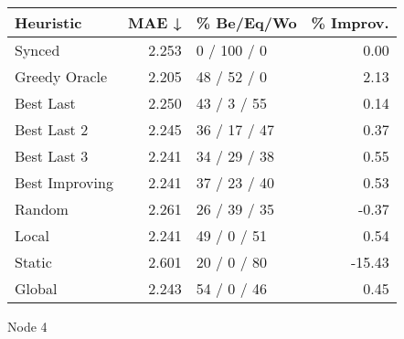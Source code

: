 \begin{tabular}{lrlr}
\toprule
\textbf{Heuristic} & \textbf{MAE ↓} & \textbf{\% Be/Eq/Wo} & \textbf{\% Improv.} \\
\midrule
            Synced &          2.253 &          0 / 100 / 0 &                0.00 \\
     Greedy Oracle &          2.205 &          48 / 52 / 0 &                2.13 \\
         Best Last &          2.250 &          43 / 3 / 55 &                0.14 \\
       Best Last 2 &          2.245 &         36 / 17 / 47 &                0.37 \\
       Best Last 3 &          2.241 &         34 / 29 / 38 &                0.55 \\
    Best Improving &          2.241 &         37 / 23 / 40 &                0.53 \\
            Random &          2.261 &         26 / 39 / 35 &               -0.37 \\
             Local &          2.241 &          49 / 0 / 51 &                0.54 \\
            Static &          2.601 &          20 / 0 / 80 &              -15.43 \\
            Global &          2.243 &          54 / 0 / 46 &                0.45 \\
\bottomrule
\end{tabular}
\caption{Node 4}
\label{tab:hr_non_lr01_le2_bs4_4}
